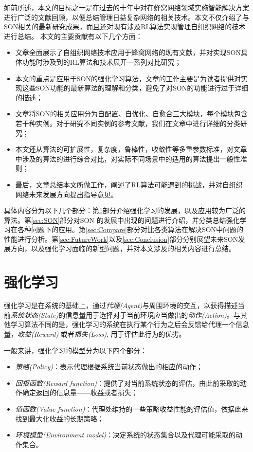 ﻿\documentclass[11pt,draftclsnofoot,onecolumn,journal,letterpaper]{IEEEtran}
\begin{document}
如前所述，本文的目标之一是在过去的十年中对在蜂窝网络领域实施智能解决方案进行广泛的文献回顾，以便总结管理日益复杂网络的相关技术。本文不仅介绍了与SON相关的最新研究成果，而且还对现有涉及RL算法实现管理自组织网络的技术进行总结。
本文的主要贡献有以下几个方面：
\begin{itemize}
  \item 文章全面展示了自组织网络技术应用于蜂窝网络的现有文献，并对实现SON具体功能时涉及到的RL算法和技术展开一系列对比研究；
  \item 本文的重点是应用于SON的强化学习算法，文章的工作主要是为读者提供对实现这些SON功能的最新算法的理解和分类，避免了对SON的功能进行过于详细的描述；
  \item 文章将SON的相关应用分为自配置、自优化、自愈合三大模块，每个模块包含若干种实例。对于研究不同实例的参考文献，我们在文章中进行详细的分类研究；
  \item 本文还从算法的可扩展性，复杂度，鲁棒性，收敛性等多重参数标准，对文章中涉及的算法的进行综合对比，对实际不同场景中的适用的算法提出一般性准则；
  \item 最后，文章总结本文所做工作，阐述了RL算法可能遇到的挑战，并对自组织网络未来发展方向提出指导意见。
\end{itemize}

具体内容分为以下几个部分：第\ref{sec:RL}部分介绍强化学习的发展，以及应用较为广泛的算法。第\ref{sec:SON}部分对SON 的发展中出现的问题进行介绍，并分类总结强化学习在各种问题下的应用。第\ref{sec:Compare}部分对比各类算法在解决SON中问题的性能进行分析。第\ref{sec:FutureWork}以及\ref{sec:Conclusion}部分分别展望未来SON发展方向，以及强化学习面临的新型问题，并对本文涉及的相关内容进行总结。
\section{强化学习}
\label{sec:RL}

强化学习是在系统的基础上，通过\emph{代理(Agent)}与周围环境的交互，以获得描述当前\emph{系统状态(State)}的信息量用于选择对于当前环境应当做出的\emph{动作(Action)}。与其他学习算法不同的是，强化学习的系统在执行某个行为之后会反馈给代理一个信息量，\emph{收益(Reward)} 或者\emph{损失(Loss)}, 用于评估此行为的优劣\cite{Sutton1998}。

一般来讲，强化学习的模型分为以下四个部分：
\begin{itemize}
\item \emph{策略(Policy)}：表示代理根据系统当前状态做出的相应的动作；
\item \emph{回报函数(Reward function)}：提供了对当前系统状态的评估，由此前采取的动作确定返回的信息量——收益或者损失；
\item \emph{值函数(Value function)}：代理处维持的一些策略收益性能的评估值，依据此来找到最大化收益的长期策略；
\item \emph{环境模型(Environment model)}：决定系统的状态集合以及代理可能采取的动作集合。
\end{itemize}
\end{document}
